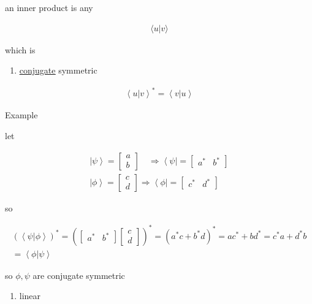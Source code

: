 \documentclass[
]{article}
\providecommand{\tightlist}{%
  \setlength{\itemsep}{0pt}\setlength{\parskip}{0pt}}
\let\oldhyperref\hyperref
\renewcommand{\hyperref}[2][]{\oldhyperref[#1]{\underline{#2}}}
\providecommand{\ket}[1]{\left\lvert #1 \right\rangle}
\providecommand{\bra}[1]{\left\langle #1 \right\rvert}
\providecommand{\braket}[1]{\left\langle #1 \right\rangle}
\providecommand{\Rarr}{\Rightarrow}
\begin{document}
an inner product is any

\begin{gather*}
	\langle u|v\rangle
\end{gather*}

which is

\begin{enumerate}
	\def\labelenumi{\arabic{enumi}.}
	\tightlist
	\item
	      \hyperref[conjugate]{conjugate} symmetric
\end{enumerate}

\begin{gather*}
	\braket{u|v}^*=\braket{v|u}
\end{gather*}

Example

let

\begin{gather*}
	\ket{\psi}=\begin{bmatrix}a\\b\end{bmatrix}\quad \Rarr \bra{\psi}=\begin{bmatrix}a^* & b^*\end{bmatrix}
	\\
	\ket{\phi}=\begin{bmatrix}c\\d\end{bmatrix}\Rarr \bra{\phi}=\begin{bmatrix}c^* & d^*\end{bmatrix}
\end{gather*}

so

\begin{gather*}
	(\braket{\psi|\phi})^*=\left(\begin{bmatrix}a^* & b^*\end{bmatrix}\begin{bmatrix}c\\d\end{bmatrix}\right)^*=(a^*c+b^*d)^*=ac^*+bd^*=c^*a+d^*b\\
	=\braket{\phi|\psi}
\end{gather*}

so \(\phi,\psi\) are conjugate symmetric

\begin{enumerate}
	\def\labelenumi{\arabic{enumi}.}
	\tightlist
	\item
	      linear
\end{enumerate}
\end{document}
